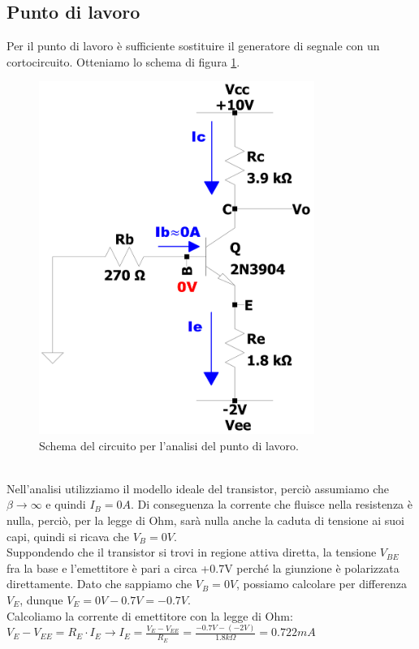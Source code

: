 \documentclass{report}
\begin{document}
\subsection{Punto di lavoro} \label{ptolavCEv2}
Per il punto di lavoro è sufficiente sostituire il generatore di segnale con un cortocircuito. Otteniamo lo schema di figura \ref{figura:CEv2_pl}.
\begin{figure}[h]
\centering
\includegraphics[height=11.5cm]{immagini/CEv2_pl}
\caption{Schema del circuito per l'analisi del punto di lavoro.}
\label{figura:CEv2_pl}
\end{figure}
\\Nell'analisi utilizziamo il modello ideale del transistor, perciò assumiamo che $\displaystyle{\beta\rightarrow\infty}$ e quindi $I_{B}=0A$. Di conseguenza la corrente che fluisce nella resistenza è nulla, perciò, per la legge di Ohm, sarà nulla anche la caduta di tensione ai suoi capi, quindi si ricava che $V_{B}=0V$. 
\\Suppondendo che il transistor si trovi in regione attiva diretta, la tensione $V_{BE}$ fra la base e l'emettitore è pari a circa +0.7V perché la giunzione è polarizzata direttamente. Dato che sappiamo che $V_{B}=0V$, possiamo calcolare per differenza $V_{E}$, dunque $V_{E}=0V-0.7V=-0.7V$.
\\Calcoliamo la corrente di emettitore con la legge di Ohm: 
\\[2pt]\indent$\displaystyle{V_E-V_{EE}=R_E\cdot I_E \rightarrow I_E=\frac{V_E-V_{EE}}{R_E}=\frac{-0.7V-(-2V)}{1.8k\Omega}=0.722mA}$
\end{document}
